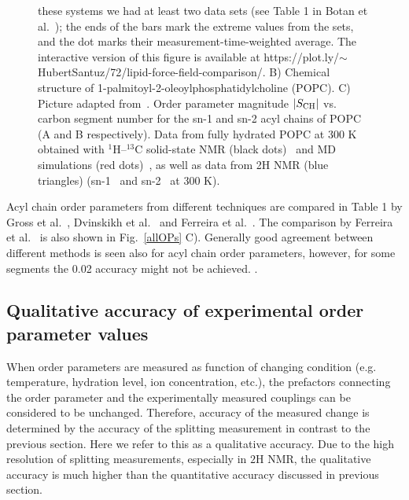 \documentclass[aps,prl,superscriptaddress,twocolumn]{revtex4}
\begin{document}
\begin{figure}[]
{    these systems we had at least two data sets (see Table 1 in Botan et al.~\cite{botan15});
    the ends of the bars mark the extreme values from the sets, and the dot marks their measurement-time-weighted average. 
    The interactive version of this figure is available at  https://plot.ly/$\sim$HubertSantuz/72/lipid-force-field-comparison/.
    B) Chemical structure of 1-palmitoyl-2-oleoylphosphatidylcholine (POPC).
    C) Picture adapted from~\cite{ferreira13}.
    Order parameter magnitude $|S_{{\rm CH}}|$ vs. carbon segment number for the
    sn-1 and sn-2 acyl chains of POPC (A and B respectively). Data from fully hydrated POPC at
    300 K obtained with $^1$H–$^{13}$C solid-state NMR (black dots)~\cite{ferreira13} and MD simulations
    (red dots)~\cite{ferreira13}, as well as data from 2H NMR (blue triangles) (sn-1~\cite{seelig78} and
    sn-2~\cite{seelig78,perly85} at 300 K).
  }
\end{figure}

Acyl chain order parameters from different techniques are compared in Table 1 by Gross et al.~\cite{gross97}, 
Dvinskikh et al.~\cite{dvinskikh05a} and Ferreira et al.~\cite{ferreira13}. The comparison by Ferreira et al.~\cite{ferreira13} 
is also shown in Fig.~\ref{allOPs} C). Generally good agreement between different methods is seen also for
acyl chain order parameters, however, for some segments the 0.02 accuracy might not be achieved.
.



\subsection{Qualitative accuracy of experimental order parameter values}

When order parameters are measured as function of changing condition (e.g. temperature, hydration level, ion concentration, etc.), 
the prefactors connecting the order parameter and the experimentally measured couplings can be considered 
to be unchanged. Therefore, accuracy of the measured change is determined by the accuracy of the splitting measurement
in contrast to the previous section. Here we refer to this as a qualitative accuracy. Due to the high resolution of
splitting measurements, especially in $ 2$H NMR, the qualitative accuracy is much higher than the
quantitative accuracy discussed in previous section.
\end{document}
